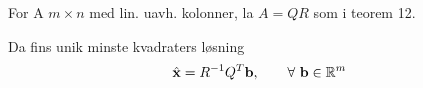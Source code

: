 For A $m\times n$ med lin. uavh. kolonner, la $A=QR$ som i teorem 12.

Da fins unik minste kvadraters løsning
$$\hat{\vecx} = R^{-1}Q^T\vecb, \qquad \forall\ \vecb\in\R^m$$

